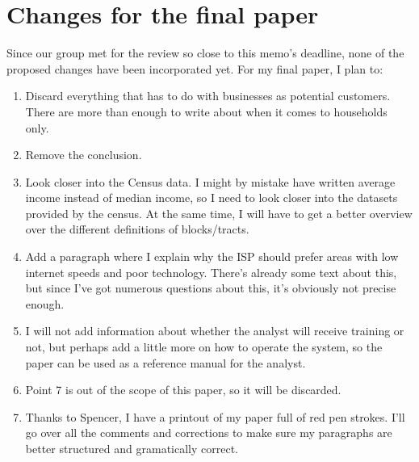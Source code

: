 \documentclass{article}
\begin{document}
\section{Changes for the final paper}
\label{sec:Changes for the final paper}
Since our group met for the review so close to this memo's deadline, none of the proposed changes have been incorporated yet. For my final paper, I plan to:
\begin{enumerate}
  \item Discard everything that has to do with businesses as potential customers. There are more than enough to write about when it comes to households only.
  \item Remove the conclusion.
  \item Look closer into the Census data. I might by mistake have written average income instead of median income, so I need to look closer into the datasets provided by the census. At the same time, I will have to get a better overview over the different definitions of blocks/tracts.
  \item Add a paragraph where I explain why the ISP should prefer areas with low internet speeds and poor technology. There's already some text about this, but since I've got numerous questions about this, it's obviously not precise enough.
  \item I will not add information about whether the analyst will receive training or not, but perhaps add a little more on how to operate the system, so the paper can be used as a reference manual for the analyst.
  \item Point 7 is out of the scope of this paper, so it will be discarded.
\item Thanks to Spencer, I have a printout of my paper full of red pen strokes. I'll go over all the comments and corrections to make sure my paragraphs are better structured and gramatically correct.
\end{enumerate}
\end{document}

